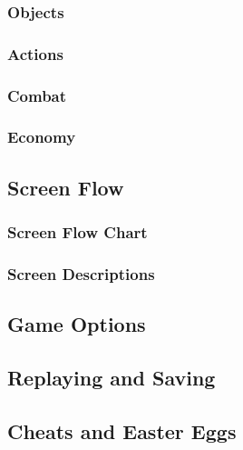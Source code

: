 \documentclass[12pt,titlepage]{article}
\begin{document}
\subsubsection{Objects}

\subsubsection{Actions}

\subsubsection{Combat}

\subsubsection{Economy}

\subsection{Screen Flow}

\subsubsection{Screen Flow Chart}

\subsubsection{Screen Descriptions}
%

\subsection{Game Options}

\subsection{Replaying and Saving}

\subsection{Cheats and Easter Eggs}
\end{document}
